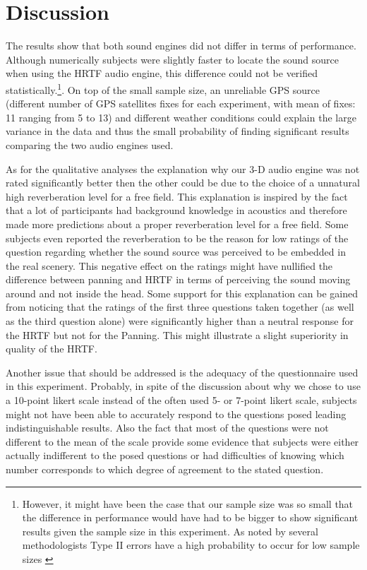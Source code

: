 \documentclass[journal]{IEEEtran}
\begin{document}
\section{Discussion}
The results show that both sound engines did not differ in terms of performance. Although numerically subjects were slightly faster to locate the sound source when using the HRTF audio engine, this difference could not be verified statistically.\footnote{However, it might have been the case that our sample size was so small that the difference in performance would have had to be bigger to show significant results given the sample size in this experiment. As noted by several methodologists Type II errors have a high probability to occur for low sample sizes \cite{DeWinter2013}}. On top of the small sample size, an unreliable GPS source (different number of GPS satellites fixes for each experiment, with mean of fixes: 11 ranging from 5 to 13) and different weather conditions could explain the large variance in the data and thus the small probability of finding significant results comparing the two audio engines used.

As for the qualitative analyses the explanation why our 3-D audio engine was not rated significantly better then the other could be due to the choice of a unnatural high reverberation level for a free field. This explanation is inspired by the fact that a lot of participants had background knowledge in acoustics and therefore made more predictions about a proper reverberation level for a free field. Some subjects even reported the reverberation to be the reason for low ratings of the question regarding whether the sound source was perceived to be embedded in the real scenery. This negative effect on the ratings might have nullified the difference between panning and HRTF in terms of perceiving the sound moving around and not inside the head. Some support for this explanation can be gained from noticing that the ratings of the first three questions taken together (as well as the third question alone) were significantly higher than a neutral response for the HRTF but not for the Panning. This might illustrate a slight superiority in quality of the HRTF.

Another issue that should be addressed is the adequacy of the questionnaire used in this experiment. Probably, in spite of the discussion about why we chose to use a 10-point likert scale instead of the often used 5- or 7-point likert scale, subjects might not have been able to accurately respond to the questions posed leading indistinguishable results. Also the fact that most of the questions were not different to the mean of the scale provide some evidence that subjects were either actually indifferent to the posed questions or had difficulties of knowing which number corresponds to which degree of agreement to the stated question.
\end{document}

